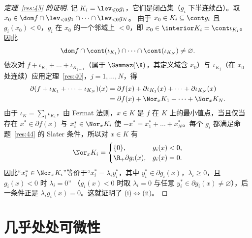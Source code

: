 \begin{proof}[定理~\ref{res:45} 的证明]
记 $K_i=\lev_{\leqslant0}g_i$，它们是闭凸集（$g_i$ 下半连续凸）。取 $x_0\in\dom f\cap\lev_{<0}g_1\cap\dots\cap\lev_{<0}g_N$。
由于 $x_0\in K_i\subseteq\cont g_i$ 且 $g_i(x_0)<0$，$g_i$ 在 $x_0$ 的一个邻域上 $<0$，即 $x_0\in\interior K_i=\cont\iota_{K_i}$。因此
\[
  \dom f\cap\cont(\iota_{K_1})\cap\dots\cap\cont(\iota_{K_N})\neq\varnothing .
\]
依次对 $f+\iota_{K_1}+\dots+\iota_{K_{j-1}}$（属于 $\Gammaz(\X)$，其定义域含 $x_0$）与 $\iota_{K_j}$（在 $x_0$ 处连续）应用定理~\ref{res:40}，$j=1,\dots,N$，得
\begin{align*}
  \partial(f+\iota_{K_1}+\dots+\iota_{K_N})(x)&=\partial f(x)+\partial\iota_{K_1}(x)+\dots+\partial\iota_{K_N}(x)\\
  &=\partial f(x)+\Nor_xK_1+\dots+\Nor_xK_N .
\end{align*}
由于 $\iota_K=\sum_i\iota_{K_i}$，由 Fermat 法则，$x\in K$ 是 $f$ 在 $K$ 上的最小值点，当且仅当存在 $x^*\in\partial f(x)$ 与 $x_i^*\in\Nor_xK_i$ 使
$-x^*=x_1^*+\dots+x_N^*$。每个 $g_i$ 都满足命题~\ref{res:44} 的 Slater 条件，所以对 $x\in K$ 有
\[
  \Nor_xK_i=\begin{cases}\{0\}, & g_i(x)<0,\\ \R_+\partial g_i(x), & g_i(x)=0.\end{cases}
\]
因此“$x_i^*\in\Nor_xK_i$”等价于“$x_i^*=\lambda_iy_i^*$，其中 $y_i^*\in\partial g_i(x)$，$\lambda_i\geqslant0$，且 $g_i(x)<0$ 时 $\lambda_i=0$”
（$g_i(x)<0$ 时取 $\lambda_i=0$ 与任意 $y_i^*\in\partial g_i(x)\neq\varnothing$），后一条件正是 $\lambda_ig_i(x)=0$。这就证明了 (i)$\iff$(ii)。
\end{proof}

\section{几乎处处可微性}

